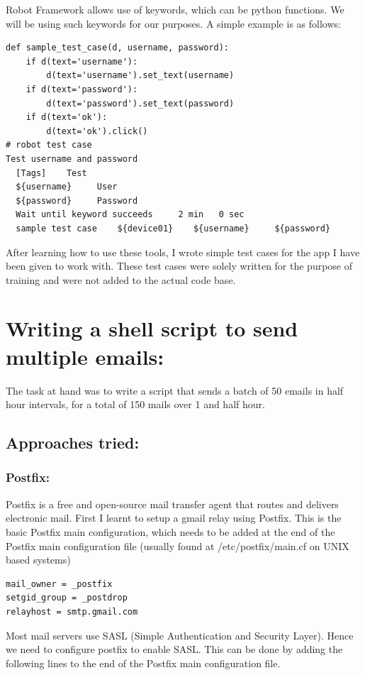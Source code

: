 Robot Framework allows use of keywords, which can be python functions. We will be using such keywords for our purposes. A simple example is as follows:

\begin{lstlisting}[style=PyStyle]
def sample_test_case(d, username, password):
	if d(text='username'):
		d(text='username').set_text(username)
	if d(text='password'):
		d(text='password').set_text(password)
	if d(text='ok'):
		d(text='ok').click()	
# robot test case
Test username and password
  [Tags]    Test
  ${username}     User
  ${password}     Password
  Wait until keyword succeeds     2 min   0 sec   
  sample test case    ${device01}    ${username}     ${password}
\end{lstlisting}
After learning how to use these tools, I wrote simple test cases for the app I have been given to work with. These test cases were solely written for the purpose of training and were not added to the actual code base. 

\section{Writing a shell script to send multiple emails:} 
The task at hand was to write a script that sends a batch of 50 emails in half hour intervals, for a total of 150 mails over 1 and half hour. \\

\subsection{Approaches tried:}

\subsubsection{Postfix:} Postfix is a free and open-source mail transfer agent that routes and delivers electronic mail. First I learnt to setup a gmail relay using Postfix. This is the basic Postfix main configuration, which needs to be added at the end of the Postfix main configuration file (usually found at /etc/postfix/main.cf on UNIX based systems)

\begin{lstlisting}[style=ShellStyle]
mail_owner = _postfix
setgid_group = _postdrop
relayhost = smtp.gmail.com
\end{lstlisting} 

Most mail servers use SASL (Simple Authentication and Security Layer). Hence we need to configure postfix to enable SASL. This can be done by adding the following lines to the end of the Postfix main configuration file. 

